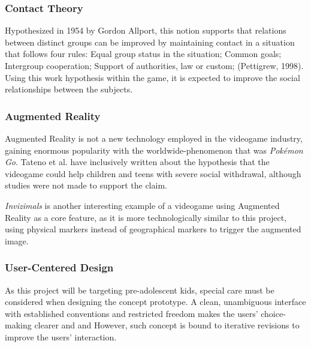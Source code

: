 \documentclass[runningheads]{llncs}
\begin{document}
\subsubsection{Contact Theory}
Hypothesized in 1954 by Gordon Allport, this notion supports that relations between distinct groups can be improved by maintaining contact in a situation that follows four rules: Equal group status in the situation; Common goals; Intergroup cooperation; Support of authorities, law or custom; (Pettigrew, 1998). Using this work hypothesis within the game, it is expected to improve the social relationships between the subjects.

\subsubsection{Augmented Reality}
Augmented Reality is not a new technology employed in the videogame industry, gaining enormous popularity with the worldwide-phenomenon that was \textit{Pokémon Go}. Tateno et al. have inclusively written about the hypothesis that the videogame could help children and teens with severe social withdrawal, although studies were not made to support the claim. 
\par \textit{Invizimals} is another interesting example of a videogame using Augmented Reality as a core feature, as it is more technologically similar to this project, using physical markers instead of geographical markers to trigger the augmented image.

\subsubsection{User-Centered Design}
As this project will be targeting pre-adolescent kids, special care must be considered when designing the concept prototype. A clean, unambiguous interface with established conventions and restricted freedom makes the users' choice-making clearer and and  However, such concept is bound to iterative revisions to improve the users' interaction.
\end{document}
